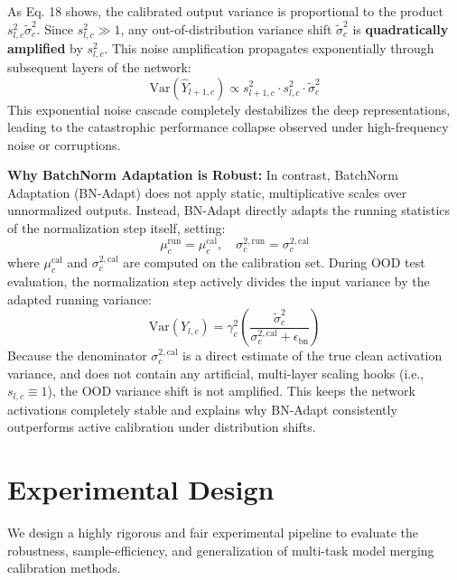 \documentclass{article}
\begin{document}
As Eq. 18 shows, the calibrated output variance is proportional to the product $s_{l,c}^2 \tilde{\sigma}^2_c$. Since $s_{l,c}^2 \gg 1$, any out-of-distribution variance shift $\tilde{\sigma}^2_c$ is \textbf{quadratically amplified} by $s_{l,c}^2$. This noise amplification propagates exponentially through subsequent layers of the network:
\begin{equation}
    \mathrm{Var}(\hat{Y}_{l+1,c}) \propto s_{l+1,c}^2 \cdot s_{l,c}^2 \cdot \tilde{\sigma}^2_c
\end{equation}
This exponential noise cascade completely destabilizes the deep representations, leading to the catastrophic performance collapse observed under high-frequency noise or corruptions.

\textbf{Why BatchNorm Adaptation is Robust:}
In contrast, BatchNorm Adaptation (BN-Adapt) does not apply static, multiplicative scales over unnormalized outputs. Instead, BN-Adapt directly adapts the running statistics of the normalization step itself, setting:
\begin{equation}
    \mu^{\mathrm{run}}_c = \mu^{\mathrm{cal}}_c, \quad \sigma^{2,\mathrm{run}}_c = \sigma^{2,\mathrm{cal}}_c
\end{equation}
where $\mu^{\mathrm{cal}}_c$ and $\sigma^{2,\mathrm{cal}}_c$ are computed on the calibration set. During OOD test evaluation, the normalization step actively divides the input variance by the adapted running variance:
\begin{equation}
    \mathrm{Var}(Y_{l,c}) = \gamma_c^2 \left( \frac{\tilde{\sigma}^2_c}{\sigma^{2,\mathrm{cal}}_c + \epsilon_{\mathrm{bn}}} \right)
\end{equation}
Because the denominator $\sigma^{2,\mathrm{cal}}_c$ is a direct estimate of the true clean activation variance, and does not contain any artificial, multi-layer scaling hooks (i.e., $s_{l,c} \equiv 1$), the OOD variance shift is not amplified. This keeps the network activations completely stable and explains why BN-Adapt consistently outperforms active calibration under distribution shifts.

\section{Experimental Design}
\label{sec:experiments}
We design a highly rigorous and fair experimental pipeline to evaluate the robustness, sample-efficiency, and generalization of multi-task model merging calibration methods.
\end{document}
